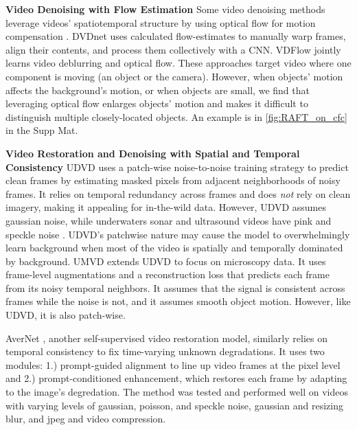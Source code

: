 \noindent{}\textbf{Video Denoising with Flow Estimation}
Some video denoising methods leverage videos' spatiotemporal structure by using optical flow for motion compensation \cite{xue2019video, tassano2020dvdnet}. DVDnet \cite{tassano2020dvdnet} uses calculated flow-estimates to manually warp frames, align their contents, and process them collectively with a CNN. VDFlow \cite{wang2020vdflow} jointly learns video deblurring and optical flow. These approaches target video where one component is moving (\eg an object or the camera). However, when objects' motion affects the background's motion, or when objects are small, we find that leveraging optical flow enlarges objects' motion and makes it difficult to distinguish multiple closely-located objects. An example is in \cref{fig:RAFT_on_cfc} in the Supp Mat.


\noindent{}\textbf{Video Restoration and Denoising with Spatial and Temporal Consistency}
UDVD \cite{Sheth_2021_ICCV} uses a patch-wise noise-to-noise training strategy to predict clean frames by estimating masked pixels from adjacent neighborhoods of noisy frames. It relies on temporal redundancy across frames and does \textit{not} rely on clean imagery, making it appealing for in-the-wild data. However, UDVD assumes gaussian noise, while underwaters sonar and ultrasound videos have pink and speckle noise  \cite{zhang2021seasonal_ambient_noise, zhou2023sonar_speckle, despeckling2013}. UDVD's patchwise nature may cause the model to overwhelmingly learn background when most of the video is spatially and temporally dominated by background. UMVD \cite{UMVD} extends UDVD to focus on microscopy data. It uses frame-level augmentations and a reconstruction loss that predicts each frame from its noisy temporal neighbors. It assumes that the signal is consistent across frames while the noise is not, and it assumes smooth object motion. However, like UDVD, it is also patch-wise. 

AverNet \cite{zhao2024avernet}, another self-supervised video restoration model, similarly relies on temporal consistency to fix time-varying unknown degradations. It uses two modules: 1.) prompt-guided alignment to line up video frames at the pixel level and 2.) prompt-conditioned enhancement, which restores each frame by adapting to the image's degredation. The method was tested and performed well on videos with varying levels of gaussian, poisson, and speckle noise, gaussian and resizing blur, and jpeg and video compression. 

